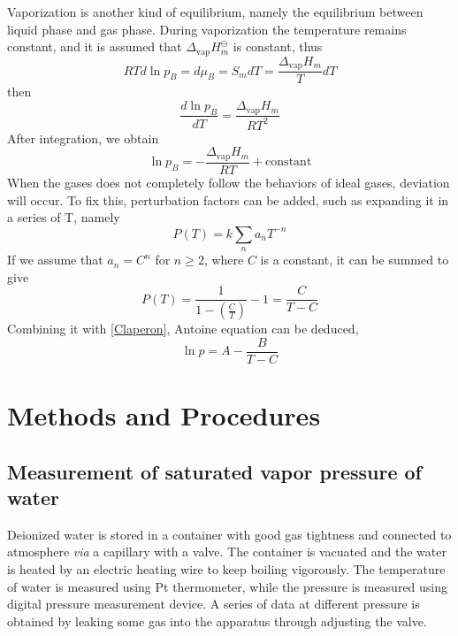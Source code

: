 \documentclass[%
 reprint,
 amsmath,amssymb,
 aps,
10.5pt,
]{revtex4-1}
\begin{document}
Vaporization is another kind of equilibrium, namely the equilibrium between liquid phase and gas phase.  During vaporization the temperature remains constant, and it is assumed that $\Delta_\text{vap} H_m^\ominus$ is constant, thus
\begin{equation}
RT d \ln{p_B} =d \mu_B = S_m dT  = \frac{\Delta_\text{vap} H_m}{T} dT
\end{equation}
then
\begin{equation}
\frac{d \ln{p_B}}{dT} = \frac{\Delta_\text{vap} H_m}{RT^2}
\end{equation}
After integration, we obtain
\begin{equation}
\ln{p_B} = -\frac{\Delta_\text{vap} H_m}{RT} + \mathrm{constant}
\label{Claperon}
\end{equation}
When the gases does not completely follow the behaviors of ideal gases, deviation will occur. To fix this, perturbation factors can be added, such as expanding it in a series of T, namely
\begin{equation}
P(T) = k\sum_n a_n T^{-n}
\end{equation}
If we assume that $a_n = C^{n}$ for $n \geq 2$, where $C$ is a constant, it can be summed to give
\begin{equation}
P(T) = \frac{1}{1-\left(\frac{C}{T}\right)} - 1 = \frac{C}{T-C}
\end{equation}
Combining it with \ref{Claperon}, Antoine equation can be deduced,
\begin{equation}
\ln{p} = A - \frac{B}{T-C}
\end{equation}

\section{Methods and Procedures}
\subsection{Measurement of saturated vapor pressure of water}
Deionized water is stored in a container with good gas tightness and connected to atmosphere \emph{via} a capillary with a valve. The container is vacuated and the water is heated by an electric heating wire to keep boiling vigorously. The temperature of water is measured using Pt thermometer, while the pressure is measured using digital pressure measurement device. A series of data at different pressure is obtained by leaking some gas into the apparatus through adjusting the valve.
\end{document}
